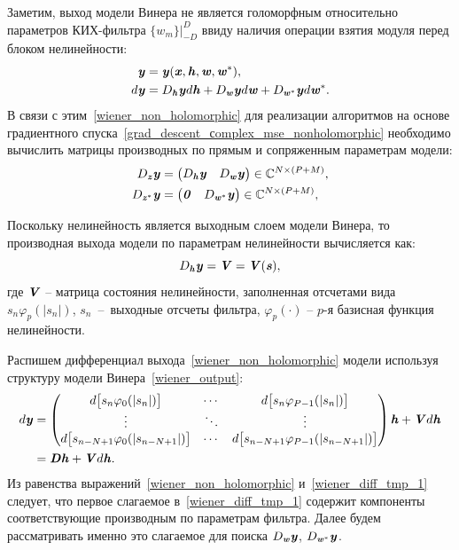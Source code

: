 Заметим, выход модели Винера не является голоморфным относительно параметров КИХ-фильтра $\{w_m\} \bigr|_{-D}^{D}$ ввиду наличия операции взятия модуля перед блоком нелинейности:
\begin{align}
	\textbf{\textit{y}}&=\textbf{\textit{y}}(\textbf{\textit{x}}, \textbf{\textit{h}}, \textbf{\textit{w}}, \textbf{\textit{w}}^*), \\
	d\textbf{\textit{y}}&=D_{\textbf{\textit{h}}}\textbf{\textit{y}}d\textbf{\textit{h}}+D_{\textbf{\textit{w}}}\textbf{\textit{y}}d\textbf{\textit{w}}+D_{\textbf{\textit{w}}^*}\textbf{\textit{y}}d\textbf{\textit{w}}^*.
	\label{wiener_non_holomorphic}
\end{align}
В связи с этим~\eqref{wiener_non_holomorphic} для реализации алгоритмов на основе градиентного спуска~\eqref{grad_descent_сomplex_mse_nonholomorphic} необходимо вычислить матрицы производных по прямым и сопряженным параметрам модели:
\begin{align}
	D_{\textbf{\textit{z}}}\textbf{\textit{y}}&=\begin{pmatrix}
		D_{\textbf{\textit{h}}}\textbf{\textit{y}} & D_{\textbf{\textit{w}}}\textbf{\textit{y}}
	\end{pmatrix}
	\in\mathbb{C}^{N\times(P+M)}, \nonumber \\
	D_{\textbf{\textit{z}}^*}\textbf{\textit{y}}&=\begin{pmatrix}
		\textbf{\textit{0}} & D_{\textbf{\textit{w}}^*}\textbf{\textit{y}}
	\end{pmatrix}
	\in\mathbb{C}^{N\times(P+M)},
	\label{wiener_jacobian_full_general}
\end{align}

Поскольку нелинейность является выходным слоем модели Винера, то производная выхода модели по параметрам нелинейности вычисляется как:
\begin{equation}
	D_{\textbf{\textit{h}}}\textbf{\textit{y}}=\textbf{\textit{V}}=\textbf{\textit{V}}(\textbf{\textit{s}}),
	\label{wiener_jac_nonlin}
\end{equation}
где $\textbf{\textit{V}}$ -- матрица состояния нелинейности, заполненная отсчетами вида $s_n\varphi_p(|s_n|)$, $s_n$~--~выходные отсчеты фильтра, $\varphi_p(\cdot)$ -- $p$-я базисная функция нелинейности.

Распишем дифференциал выхода~\eqref{wiener_non_holomorphic} модели используя структуру модели Винера~\eqref{wiener_output}:
\begin{align}
	d\textbf{\textit{y}}&=\begin{pmatrix}
		d\big[s_n\varphi_0(|s_n|)\big] & \cdots & d\big[s_n\varphi_{P-1}(|s_n|)\big] \\
		\vdots & \ddots & \vdots \\
		d\big[s_{n-N+1}\varphi_0(|s_{n-N+1}|)\big] & \cdots & d\big[s_{n-N+1}\varphi_{P-1}(|s_{n-N+1}|)\big] \\
	\end{pmatrix}\textbf{\textit{h}}+\textbf{\textit{V}}d\textbf{\textit{h}} \nonumber \\
	&=\textbf{\textit{D}}\textbf{\textit{h}}+\textbf{\textit{V}}d\textbf{\textit{h}}.
	\label{wiener_diff_tmp_1}
\end{align}
Из равенства выражений~\eqref{wiener_non_holomorphic} и~\eqref{wiener_diff_tmp_1} следует, что первое слагаемое в~\eqref{wiener_diff_tmp_1} содержит компоненты соответствующие производным по параметрам фильтра. Далее будем рассматривать именно это слагаемое для поиска $D_{\textbf{\textit{w}}}\textbf{\textit{y}}$,  $D_{\textbf{\textit{w}}^*}\textbf{\textit{y}}$.

